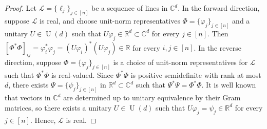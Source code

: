 \documentclass[11pt]{article}
\theoremstyle{definition}
\numberwithin{equation}{section}
\begin{document}
\begin{proof}
Let $\mathscr{L} = \{ \ell_j \}_{j\in [n]}$ be a sequence of lines in $\mathbb{C}^d$.
In the forward direction, suppose $\mathscr{L}$ is real, and choose unit-norm representatives $\Phi = \{ \varphi_j \}_{j\in [n]}$ and a unitary $U \in \operatorname{U}(d)$ such that $U \varphi_j \in \mathbb{R}^d \subset \mathbb{C}^d$ for every $j \in [n]$.
Then $[\Phi^* \Phi]_{ij} = \varphi_i^* \varphi_j = (U \varphi_i)^* (U \varphi_j) \in \mathbb{R}$ for every $i,j \in [n]$.
In the reverse direction, suppose $\Phi = \{ \varphi_j \}_{j\in[n]}$ is a choice of unit-norm representatives for $\mathscr{L}$ such that $\Phi^* \Phi$ is real-valued.
Since $\Phi^* \Phi$ is positive semidefinite with rank at most $d$, there exists $\Psi = \{ \psi_j \}_{j \in [n]}$ in $\mathbb{R}^d \subset \mathbb{C}^d$ such that $\Psi^* \Psi = \Phi^*\Phi$.
It is well known that vectors in $\mathbb{C}^d$ are determined up to unitary equivalence by their Gram matrices, so there exists a unitary $U \in \operatorname{U}(d)$ such that $U \varphi_j = \psi_j \in \mathbb{R}^d$ for every $j \in [n]$.
Hence, $\mathscr{L}$ is real.
\end{proof}
\end{document}
